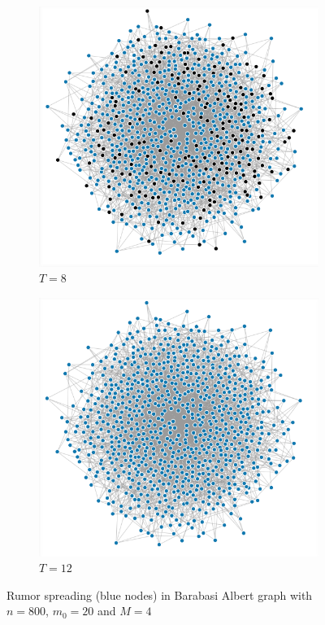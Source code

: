 \documentclass[10pt,journal,a4paper]{IEEEtran}
\begin{document}
\begin{figure}
\begin{subfigure}[b]{.5\linewidth}
\includegraphics[width=1\linewidth]{figs/barabasi-albert-8}
\caption{$T=8$}
\end{subfigure}%
\begin{subfigure}[b]{.5\linewidth}
\includegraphics[width=1\linewidth]{figs/barabasi-albert-12}
\caption{$T=12$}
\end{subfigure}

\caption{Rumor spreading (blue nodes) in Barabasi Albert graph with $n=800$, $m_0 = 20$ and $M = 4$}
\label{barabasi-albert-graphs}
\end{figure}
\end{document}
